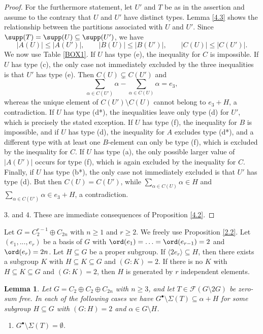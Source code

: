 \documentclass[a4paper, 10pt]{amsart}
\theoremstyle{plain}
\newtheorem{lemma}[theorem]{\bf Lemma}
\theoremstyle{definition}
\numberwithin{equation}{section}
\begin{document}
{\begin{proof}
For the furthermore statement, let $U'$ and $T$ be as in the assertion and assume to the contrary that $U$ and $U'$ have distinct types.  Lemma \ref{4.3} shows the relationship between  the partitions associated with $U$ and $U'$. Since $\supp(T)=\supp(U)\subseteq\supp(U')$, we have
\[
|A(U)|\le |A(U')|,\qquad |B(U)|\le |B(U')|,\qquad |C(U)|\le |C(U')|.
\]
We now use Table \ref{BOX1}. If $U$ has type (e), the inequality for $C$ is impossible. If $U$ has type (c), the only case not immediately excluded by the three inequalities is that $U'$ has type (e). Then $C(U)\subsetneq C(U')$ and
\[
\sum_{\alpha\in C(U')}\alpha-\sum_{\alpha\in C(U)}\alpha=e_3,
\]
whereas the unique element of $C(U')\setminus C(U)$ cannot belong to $e_3+H$, a contradiction. If $U$ has type (d*), the inequalities leave only type (d) for $U'$, which is precisely the stated exception. If $U$ has type (f), the inequality for $B$ is impossible, and if $U$ has type (d), the inequality for $A$ excludes type (d*), and a different type with at least one $B$-element can only be type (f), which is excluded by the inequality for $C$. If $U$ has type (a), the only possible larger value of $|A(U')|$ occurs for type (f), which is again excluded by the inequality for $C$. Finally, if $U$ has type (b*), the only case not immediately excluded is that $U'$ has type (d). But then $C(U)=C(U')$, while $\sum_{\alpha\in C(U)}\alpha\in H$ and $\sum_{\alpha\in C(U')}\alpha\in e_3+H$, a contradiction. 

3. and 4. These are immediate consequences of Proposition \ref{4.2}.
\end{proof}





Let $G=C_2^{r-1} \oplus C_{2n}$ with $n \ge 1$ and $r \ge 2$. We freely use Proposition \ref{2.2}.
Let $(e_1, ...,e_r)$ be a basis of $G$ with $\ord (e_1)=\ldots = 
\ord (e_{r-1})=2$ and $\ord (e_r)=2n$.
Let $H \subseteq G$ be a proper subgroup. If  $\langle 2e_r \rangle \subseteq H$, then
there exists a subgroup $K$ with $H \subseteq  K \subseteq G$ and $ (G:K)=2$.
If there is no $K$ with $H \subseteq  K \subseteq G$ and $ (G:K)=2$, then $H$ is generated by $r$ independent elements.

\begin{lemma}\label{4.5}
	Let $G = C_2 \oplus C_2 \oplus C_{2n}$ with $n\geq 3$, and let $T \in \mathcal F (G\setminus 2G)$ be zero-sum free. In each of the following cases we have $G^{\bullet} \setminus \Sigma (T) \subseteq \alpha + H$ for some subgroup $H \subseteq G$ with $(G \colon H)=2$ and $\alpha \in G \setminus H$.
	\begin{enumerate}
		\item[(a)] $G^{\bullet} \setminus \Sigma (T) = \emptyset$.
		

\end{enumerate}
\end{lemma}}
\end{document}
